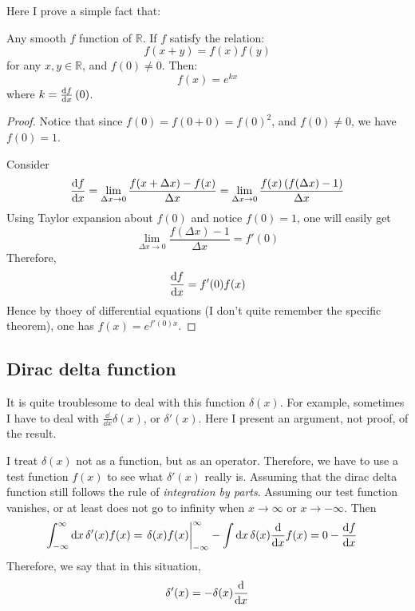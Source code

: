 Here I prove a simple fact that:
\begin{thm}
    Any smooth $f$ function of $\mathbb{R}$. If $f$ satisfy the
    relation:
    \begin{equation}
        f(x+y)=f(x)f(y)
    \end{equation}
    for any $x,y\in \mathbb{R}$, and $f(0)\neq 0$. Then:
    \begin{equation}
        f(x) = e^{k x}
    \end{equation}
    where $k=\dv{f}{x}\left(0\right)$.
\end{thm}
\begin{proof}
    Notice that since $f(0)=f(0+0)=f(0)^2$, and $f(0)\neq 0$, we have
    $f(0)=1$.

    Consider
    \begin{align*}
        \dv{f}{x} = \lim_{\Delta x\to 0} 
        \frac{f(x+\Delta x)-f(x)}{\Delta x}
            = \lim_{\Delta x\to 0} 
            \frac{f(x)\left(f(\Delta x)-1\right)}{\Delta x}
    \end{align*}
    Using Taylor expansion about $f(0)$ and notice $f(0)=1$, one will
    easily get
    \begin{equation*}
        \lim_{\Delta x\to 0} 
            \frac{f(\Delta x)-1}{\Delta x}
            = f'(0)
    \end{equation*}
    Therefore, 
    \begin{equation*}
        \dv{f}{x} = f'(0)f(x)
    \end{equation*}
    Hence by thoey of differential equations (I don't quite remember
    the specific theorem), one has $f(x)=e^{f'(0)x}$.
\end{proof}
    
\subsection{Dirac delta function}

It is quite troublesome to deal with this function $\delta(x)$. For example, sometimes I
have to deal with $\frac{\dd}{\dd{x}}\delta(x)$, or $\delta'(x)$. Here I present an argument, not
proof, of the result.

I treat $\delta(x)$ not as a function, but as an operator. Therefore, we have to
use a test function $f(x)$ to see what $\delta'(x)$ really is. Assuming that the
dirac delta function still follows the rule of \textit{integration by parts}.
Assuming our test function vanishes, or at least does not go to infinity when
$x\to\infty$ or $x\to-\infty$. Then
\begin{align}
    \int_{-\infty}^\infty \dd{x} \delta'(x) f(x) &=
    \eval{\delta(x)f(x)}_{-\infty}^\infty - \int\dd{x}\delta(x)\frac{\dd}{\dd x}f(x)
    = 0 - \dv{f}{x}(0)
\end{align}
Therefore, we say that in this situation,
\begin{equation}
    \delta'(x) = -\delta(x)\dv{x}
\end{equation}

